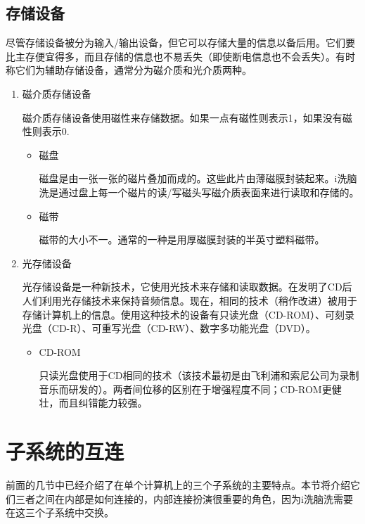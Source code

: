 \subsection{存储设备}
尽管存储设备被分为输入/输出设备，但它可以存储大量的信息以备后用。它们要比主存便宜得多，而且存储的信息也不易丢失（即使断电信息也不会丢失）。有时称它们为辅助存储设备，通常分为磁介质和光介质两种。
\begin{enumerate}
	\item 磁介质存储设备

	磁介质存储设备使用磁性来存储数据。如果一点有磁性则表示1，如果没有磁性则表示0.
	\begin{itemize}
		\item 磁盘

		磁盘是由一张一张的磁片叠加而成的。这些此片由薄磁膜封装起来。i洗脑洗是通过盘上每一个磁片的读/写磁头写磁介质表面来进行读取和存储的。
		\item 磁带

		磁带的大小不一。通常的一种是用厚磁膜封装的半英寸塑料磁带。
	\end{itemize}
	\item 光存储设备

	光存储设备是一种新技术，它使用光技术来存储和读取数据。在发明了CD后人们利用光存储技术来保持音频信息。现在，相同的技术（稍作改进）被用于存储计算机上的信息。使用这种技术的设备有只读光盘（CD-ROM）、可刻录光盘（CD-R）、可重写光盘（CD-RW）、数字多功能光盘（DVD）。
	\begin{itemize}
		\item CD-ROM

		只读光盘使用于CD相同的技术（该技术最初是由飞利浦和索尼公司为录制音乐而研发的）。两者间位移的区别在于增强程度不同；CD-ROM更健壮，而且纠错能力较强。
	\end{itemize}
\end{enumerate}
\section{子系统的互连}
前面的几节中已经介绍了在单个计算机上的三个子系统的主要特点。本节将介绍它们三者之间在内部是如何连接的，内部连接扮演很重要的角色，因为i洗脑洗需要在这三个子系统中交换。
